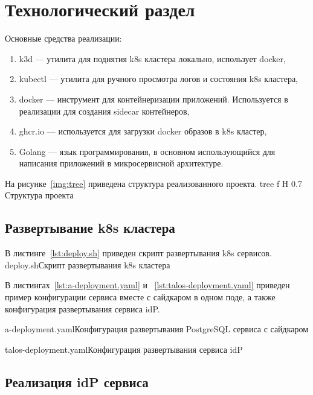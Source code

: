 \chapter{Технологический раздел}

Основные средства реализации:
\begin{enumerate}
\item k3d --- утилита для поднятия k8s кластера локально, использует docker, %
\item kubectl --- утилита для ручного просмотра логов и состояния k8s кластера,
\item docker --- инструмент для контейнеризации приложений. Используется в реализации для создания sidecar контейнеров,
\item ghcr.io --- используется для загрузки docker образов в k8s кластер,
\item Golang --- язык программирования, в основном использующийся для написания приложений в микросервисной архитектуре. %
\end{enumerate}

На рисунке~\ref{img:tree} приведена структура реализованного проекта.
    {tree}
    {f}
    {H}
    {0.7\textwidth}
    {Структура проекта}


\section{Развертывание k8s кластера}
В листинге~\ref{lst:deploy.sh} приведен скрипт развертывания k8s сервисов. 
	{deploy.sh}{Скрипт развертывания k8s кластера}

В листингах~\ref{lst:a-deployment.yaml} и ~\ref{lst:talos-deployment.yaml} приведен пример  конфигурации сервиса вместе с сайдкаром в одном поде, а также конфигурация развертывания сервиса idP. 

	{a-deployment.yaml}{Конфигурация развертывания PostgreSQL сервиса с сайдкаром}

	{talos-deployment.yaml}{Конфигурация развертывания сервиса idP}

\section{Реализация idP сервиса}

